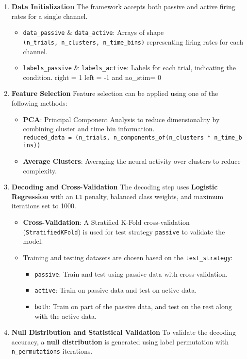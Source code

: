 \documentclass[
  letterpaper,
  DIV=11,
  numbers=noendperiod]{scrartcl}
\providecommand{\tightlist}{%
  \setlength{\itemsep}{0pt}\setlength{\parskip}{0pt}}\usepackage{longtable,booktabs,array}
\begin{document}
\begin{enumerate}
\def\labelenumi{\arabic{enumi}.}
\item
  \textbf{Data Initialization} The framework accepts both passive and
  active firing rates for a single channel.

  \begin{itemize}
  \tightlist
  \item
    \texttt{data\_passive} \& \texttt{data\_active}: Arrays of shape
    \texttt{(n\_trials,\ n\_clusters,\ n\_time\_bins)} representing
    firing rates for each channel.
  \item
    \texttt{labels\_passive} \& \texttt{labels\_active}: Labels for each
    trial, indicating the condition. right = 1 left = -1 and no\_stim= 0
  \end{itemize}
\item
  \textbf{Feature Selection} Feature selection can be applied using one
  of the following methods:

  \begin{itemize}
  \tightlist
  \item
    \textbf{PCA}: Principal Component Analysis to reduce dimensionality
    by combining cluster and time bin information.
    \texttt{reduced\_data\ =\ (n\_trials,\ n\_components\_of(n\_clusters\ *\ n\_time\_bins))}
  \item
    \textbf{Average Clusters}: Averaging the neural activity over
    clusters to reduce complexity.
  \end{itemize}
\item
  \textbf{Decoding and Cross-Validation} The decoding step uses
  \textbf{Logistic Regression} with an \texttt{L1} penalty, balanced
  class weights, and maximum iterations set to 1000.

  \begin{itemize}
  \tightlist
  \item
    \textbf{Cross-Validation}: A Stratified K-Fold cross-validation
    (\texttt{StratifiedKFold}) is used for test strategy
    \texttt{\textquotesingle{}passive\textquotesingle{}} to validate the
    model.
  \item
    Training and testing datasets are chosen based on the
    \texttt{test\_strategy}:

    \begin{itemize}
    \tightlist
    \item
      \texttt{\textquotesingle{}passive\textquotesingle{}}: Train and
      test using passive data with cross-validation.
    \item
      \texttt{\textquotesingle{}active\textquotesingle{}}: Train on
      passive data and test on active data.
    \item
      \texttt{\textquotesingle{}both\textquotesingle{}}: Train on part
      of the passive data, and test on the rest along with the active
      data.
    \end{itemize}
  \end{itemize}
\item
  \textbf{Null Distribution and Statistical Validation} To validate the
  decoding accuracy, a \textbf{null distribution} is generated using
  label permutation with \texttt{n\_permutations} iterations.


\end{enumerate}
\end{document}

